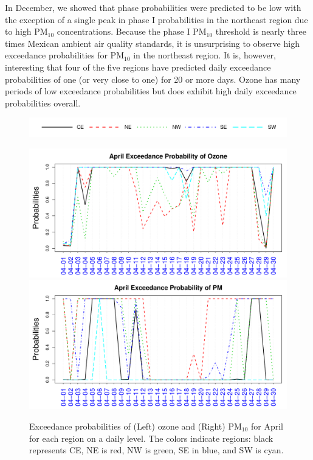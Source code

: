 \documentclass[alpha-refs]{wiley-article}
\begin{document}
In December, we showed that phase probabilities were predicted to be low with the exception of a single peak in phase I probabilities in the northeast region due to high $\text{PM}_{10}$ concentrations. Because the phase I $\text{PM}_{10}$ threshold is nearly three times Mexican ambient air quality standards, it is unsurprising to observe high exceedance probabilities for $\text{PM}_{10}$ in the northeast region. It is, however, interesting that four of the five regions have predicted daily exceedance probabilities of one (or very close to one) for 20 or more days. Ozone has many periods of low exceedance probabilities but does exhibit high daily exceedance probabilities overall.
\vspace{-8mm}  
\begin{figure}[H]
  \begin{center}
  \hspace{.1\textwidth}
  \includegraphics[width=\textwidth]{phase_reg_legend}

  \vspace{-4mm}

      \includegraphics[width=.45\textwidth]{exceed_prob_O3_apr}
            \includegraphics[width=.45\textwidth]{exceed_prob_PM10_apr}

  \end{center}
  \vspace{-6mm}
       \caption{Exceedance probabilities of (Left) ozone and (Right) $\text{PM}_{10}$ for April for each region on a daily level. The colors indicate regions: black represents CE, NE is red, NW is green, SE in blue, and SW is cyan.}\label{fig:prob_apr_O3}
\end{figure}
\end{document}
